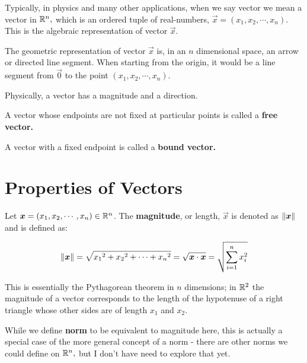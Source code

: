 \documentclass{article}
\begin{document}
\begin{note}
Typically, in physics and many other applications, when we say \@{vector} we mean a \@{vector} in $\mathbb{R}^n,$ which is an ordered tuple of \@{real-numbers}, $\vec{x} = (x_1, x_2, \cdots, x_n).$ This is the algebraic representation of vector $\vec{x}$.

The geometric representation of vector $\vec{x}$ is, in an $n$ dimensional space, an arrow or directed line segment. When starting from the origin, it would be a line segment from $\vec{0}$ to the point $(x_1, x_2, \cdots, x_n)$.

Physically, a vector has a \@{magnitude} and a \@{direction}.
\end{note}

\begin{definition}
A \@{vector} whose endpoints are not fixed at particular \@{points} is called a \textbf{free vector.}
\end{definition}

\begin{definition}
A \@{vector} with a fixed endpoint is called a \textbf{bound vector.}
\end{definition}

\section{Properties of Vectors}

\begin{definition}[Magnitude]
Let $\boldsymbol{x} = (x_1, x_2, \cdots, x_n) \in \mathbb{R}^n$.  The \textbf{magnitude}, or length, $\vec{x}$ is denoted as $\left\lVert \boldsymbol{x} \right\rVert$ and is defined as:

\[ \left\lVert \boldsymbol{x} \right\rVert = \sqrt{ {x_1}^2 + {x_2}^2 + \cdots + {x_n}^2 } = \sqrt{\boldsymbol{x} \cdot \boldsymbol{x}} = \sqrt{\sum_{i=1}^n x_i^2} \]
\end{definition}

\begin{note}
This is essentially the Pythagorean theorem in $n$ dimensions; in $\mathbb{R}^2$ the \@{magnitude} of a \@{vector} corresponds to the length of the hypotenuse of a right triangle whose other sides are of length $x_1$ and $x_2.$

While we define \textbf{norm} to be equivalent to magnitude here, this is actually a special case of the more general concept of a norm - there are other norms we could define on $\mathbb{R}^n,$ but I don't have need to explore that yet.
\end{note}
\end{document}
